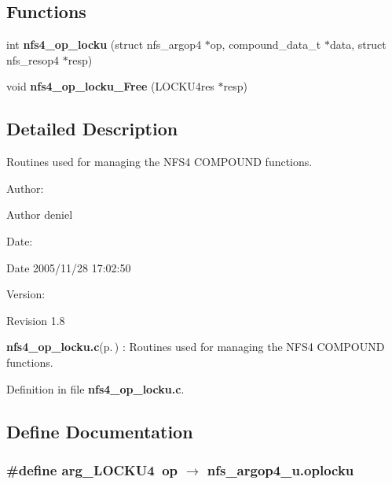 \subsection*{Functions}
\begin{CompactItemize}
\item 
int {\bf nfs4\_\-op\_\-locku} (struct nfs\_\-argop4 $\ast$op, compound\_\-data\_\-t $\ast$data, struct nfs\_\-resop4 $\ast$resp)
\item 
void {\bf nfs4\_\-op\_\-locku\_\-Free} (LOCKU4res $\ast$resp)
\end{CompactItemize}


\subsection{Detailed Description}
Routines used for managing the NFS4 COMPOUND functions. 

\begin{Desc}
\item[Author:]\begin{Desc}
\item[Author]deniel \end{Desc}
\end{Desc}
\begin{Desc}
\item[Date:]\begin{Desc}
\item[Date]2005/11/28 17:02:50 \end{Desc}
\end{Desc}
\begin{Desc}
\item[Version:]\begin{Desc}
\item[Revision]1.8 \end{Desc}
\end{Desc}
{\bf nfs4\_\-op\_\-locku.c}{\rm (p.\,\pageref{nfs4__op__locku_8c})} : Routines used for managing the NFS4 COMPOUND functions.

Definition in file {\bf nfs4\_\-op\_\-locku.c}.

\subsection{Define Documentation}
\subsubsection{\setlength{\rightskip}{0pt plus 5cm}\#define arg\_\-LOCKU4\ op $\rightarrow$ nfs\_\-argop4\_\-u.oplocku}\label{nfs4__op__locku_8c_a0}


